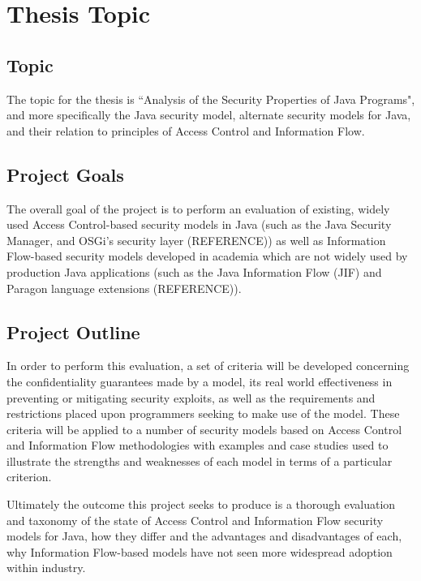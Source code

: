 \section{Thesis Topic}

\subsection{Topic}

The topic for the thesis is ``Analysis of the Security Properties of Java Programs", and more specifically the Java security model, alternate security models for Java, and their relation to principles of Access Control and Information Flow. 

\subsection{Project Goals}

The overall goal of the project is to perform an evaluation of existing, widely used Access Control-based security models in Java (such as the Java Security Manager, and OSGi's security layer (REFERENCE)) as well as Information Flow-based security models developed in academia which are not widely used by production Java applications (such as the Java Information Flow (JIF) and Paragon language extensions (REFERENCE)).

\subsection{Project Outline}

In order to perform this evaluation, a set of criteria will be developed concerning the confidentiality guarantees made by a model, its real world effectiveness in preventing or mitigating security exploits, as well as the requirements and restrictions placed upon programmers seeking to make use of the model. These criteria will be applied to a number of security models based on Access Control and Information Flow methodologies with examples and case studies used to illustrate the strengths and weaknesses of each model in terms of a particular criterion.

Ultimately the outcome this project seeks to produce is a thorough evaluation and taxonomy of the state of Access Control and Information Flow security models for Java, how they differ and the advantages and disadvantages of each, why Information Flow-based models have not seen more widespread adoption within industry.


